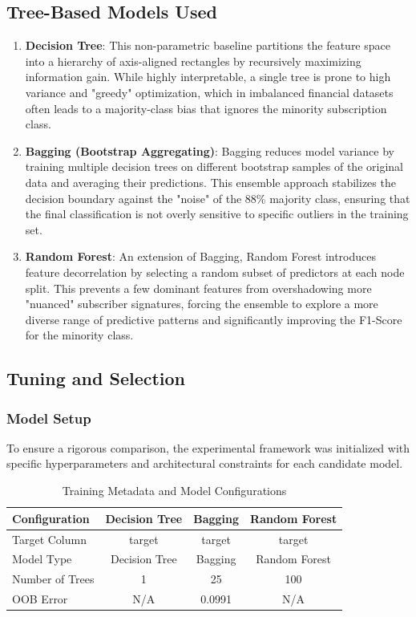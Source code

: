 \documentclass[conference]{IEEEtran}
\begin{document}
\subsection{\textbf{Tree-Based Models Used}}

\begin{enumerate}
	\item \textbf{Decision Tree}: This non-parametric baseline partitions the feature space into a hierarchy of axis-aligned rectangles by recursively maximizing information gain. While highly interpretable, a single tree is prone to high variance and "greedy" optimization, which in imbalanced financial datasets often leads to a majority-class bias that ignores the minority subscription class.
	\item \textbf{Bagging (Bootstrap Aggregating)}: Bagging reduces model variance by training multiple decision trees on different bootstrap samples of the original data and averaging their predictions. This ensemble approach stabilizes the decision boundary against the "noise" of the 88\% majority class, ensuring that the final classification is not overly sensitive to specific outliers in the training set.
	\item \textbf{Random Forest}: An extension of Bagging, Random Forest introduces feature decorrelation by selecting a random subset of predictors at each node split. This prevents a few dominant features from overshadowing more "nuanced" subscriber signatures, forcing the ensemble to explore a more diverse range of predictive patterns and significantly improving the F1-Score for the minority class.\\
\end{enumerate}

\newpage
\subsection{\textbf{Tuning and Selection}}
\subsubsection*{\textbf{Model Setup}}
To ensure a rigorous comparison, the experimental framework was initialized with specific hyperparameters and architectural constraints for each candidate model.

\begin{table}[ht]
	\centering
	\caption{Training Metadata and Model Configurations}
	\label{tab:model_configs}
	\begin{tabular}{lccc}
		\hline \hline
		\textbf{Configuration} & \textbf{Decision Tree} & \textbf{Bagging} & \textbf{Random Forest} \\
		\hline
		Target Column    & target        & target        & target        \\
		Model Type       & Decision Tree & Bagging       & Random Forest \\
		Number of Trees  & 1             & 25            & 100           \\
		OOB Error        & N/A           & 0.0991        & N/A           \\
		\hline \hline
	\end{tabular}
\end{table}
\end{document}
